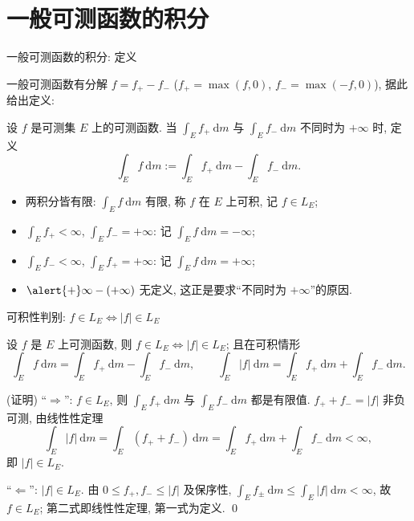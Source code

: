 
\section[一般可测]{一般可测函数的积分}


\begin{frame}{一般可测函数的积分: 定义}

一般可测函数有分解 $f = f_+ - f_-$ ($f_+ = \max(f, 0)$, $f_- = \max(-f, 0)$), 据此给出定义:

\begin{Def}[一般可测函数的积分]
设 $f$ 是可测集 $E$ 上的可测函数. 当 $\int_E f_+ ~ \mathrm{d} m$ 与 $\int_E f_- ~ \mathrm{d} m$
\alert{不同时为 $+\infty$} 时, 定义
\[
\int_E f ~ \mathrm{d} m := \int_E f_+ ~ \mathrm{d} m - \int_E f_- ~ \mathrm{d} m .
\]
\end{Def}

\pause

\begin{itemize}
\item 两积分皆有限: $\int_E f ~ \mathrm{d} m$ 有限, 称 $f$ 在 $E$ 上\alert{可积}, 记 $f \in L_E$;
\item $\int_E f_+ < \infty$, $\int_E f_- = +\infty$: 记 $\int_E f ~ \mathrm{d} m = -\infty$;
\item $\int_E f_- < \infty$, $\int_E f_+ = +\infty$: 记 $\int_E f ~ \mathrm{d} m = +\infty$;
\item $\alert{+}\infty - (+\infty)$ 无定义, 这正是要求``不同时为 $+\infty$''的原因.
\end{itemize}

\end{frame}


\begin{frame}{可积性判别: $f \in L_E \iff |f| \in L_E$}

\begin{thm}
设 $f$ 是 $E$ 上可测函数, 则 $f \in L_E \iff |f| \in L_E$; 且在可积情形
\[
\int_E f ~ \mathrm{d} m = \int_E f_+ ~ \mathrm{d} m - \int_E f_- ~ \mathrm{d} m,
\qquad
\int_E |f| ~ \mathrm{d} m = \int_E f_+ ~ \mathrm{d} m + \int_E f_- ~ \mathrm{d} m .
\]
\end{thm}

\startproof[bg=yellow, fg=red](证明)
``$\Rightarrow$'': $f \in L_E$, 则 $\int_E f_+ ~ \mathrm{d} m$ 与 $\int_E f_- ~ \mathrm{d} m$ 都是有限值.
$f_+ + f_- = |f|$ 非负可测, 由线性性定理
\[
\int_E |f| ~ \mathrm{d} m = \int_E (f_+ + f_-) ~ \mathrm{d} m
= \int_E f_+ ~ \mathrm{d} m + \int_E f_- ~ \mathrm{d} m < \infty,
\]
即 $|f| \in L_E$.

\pause

``$\Leftarrow$'': $|f| \in L_E$. 由 $0 \leqslant f_+, f_- \leqslant |f|$ 及保序性,
$\int_E f_\pm ~ \mathrm{d} m \leqslant \int_E |f| ~ \mathrm{d} m < \infty$,
故 $f \in L_E$; 第二式即线性性定理, 第一式为定义. \qed

\end{frame}

